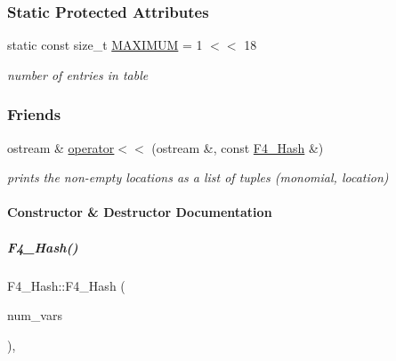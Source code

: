 \subsubsection*{Static Protected Attributes}
\begin{DoxyCompactItemize}
\item 
\mbox{\label{group___g_b_computation_acf7ba1127b19f75bfcd7177c4de99d01}} 
static const size\+\_\+t \hyperlink{group___g_b_computation_acf7ba1127b19f75bfcd7177c4de99d01}{M\+A\+X\+I\+M\+UM} = 1 $<$$<$ 18
\begin{DoxyCompactList}\small\item\em number of entries in table \end{DoxyCompactList}\end{DoxyCompactItemize}
\subsubsection*{Friends}
\begin{DoxyCompactItemize}
\item 
\mbox{\label{group___g_b_computation_a979748da85dd3012fb925b0ff6b9b71c}} 
ostream \& \hyperlink{group___g_b_computation_a979748da85dd3012fb925b0ff6b9b71c}{operator$<$$<$} (ostream \&, const \hyperlink{group___g_b_computation_class_f4___hash}{F4\+\_\+\+Hash} \&)
\begin{DoxyCompactList}\small\item\em prints the non-\/empty locations as a list of tuples (monomial, location) \end{DoxyCompactList}\end{DoxyCompactItemize}


\paragraph{Constructor \& Destructor Documentation}
\mbox{\label{group___g_b_computation_a3983b59e08fa7ad90bba989850f9850f}} 
\subparagraph{\texorpdfstring{F4\+\_\+\+Hash()}{F4\_Hash()}}
{\footnotesize\ttfamily F4\+\_\+\+Hash\+::\+F4\+\_\+\+Hash (\begin{DoxyParamCaption}\item[{N\+V\+A\+R\+\_\+\+T\+Y\+PE}]{num\+\_\+vars }\end{DoxyParamCaption})\hspace{0.3cm}{\ttfamily [inline]}, {\ttfamily [explicit]}}



